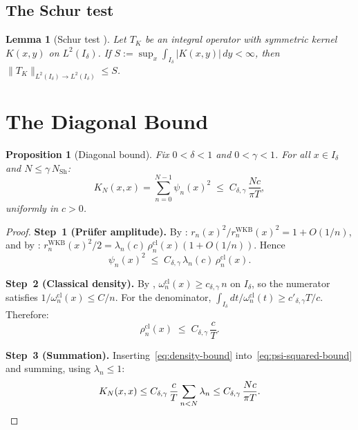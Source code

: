 \documentclass[12pt,a4paper]{article}
\newtheorem{proposition}[theorem]{Proposition}
\newtheorem{lemma}[theorem]{Lemma}
\theoremstyle{definition}
\newcommand{\NSh}{N_{\mathrm{Sh}}}
\newcommand{\wcl}{\omega_n^{\mathrm{cl}}}
\newcommand{\rhocl}{\rho_n^{\mathrm{cl}}}
\newcommand{\rWKB}{r_n^{\mathrm{WKB}}}
\begin{document}
\subsection{The Schur test}

\begin{lemma}[Schur test {\cite[Thm.~VI.23]{ReedSimonI}}]
\label{lem:schur}
Let $T_K$ be an integral operator with symmetric kernel
$K(x,y)$ on $L^2(I_\delta)$. If
$S := \sup_{x}\int_{I_\delta}|K(x,y)|\,dy < \infty$,
then
$\|T_K\|_{L^2(I_\delta)\to L^2(I_\delta)} \le S$.
\end{lemma}

\section{The Diagonal Bound}
\label{sec:diagonal}

\begin{proposition}[Diagonal bound]
\label{prop:diagonal}
Fix $0 < \delta < 1$ and $0 < \gamma < 1$.
For all $x \in I_\delta$ and $N \le \gamma\,\NSh$:
\begin{equation}
\label{eq:diagonal}
  K_N(x,x) = \sum_{n=0}^{N-1}\psi_n(x)^2
  \;\le\; C_{\delta,\gamma}\,\frac{Nc}{\pi T},
\end{equation}
uniformly in $c > 0$.
\end{proposition}

\begin{proof}
\textbf{Step~1 (Pr\"ufer amplitude).}
By \cite[Lemma~4.2]{PaperIV}:
$r_n(x)^2/\rWKB(x)^2 = 1 + O(1/n)$,
and by \cite[Lemma~4.3]{PaperIV}:
$\rWKB(x)^2/2 = \lambda_n(c)\,\rhocl(x)(1+O(1/n))$.
Hence
\begin{equation}
\label{eq:psi-squared-bound}
  \psi_n(x)^2
  \;\le\; C_{\delta,\gamma}\,\lambda_n(c)\,\rhocl(x).
\end{equation}

\textbf{Step~2 (Classical density).}
By \cite[Lemma~2.5(i)]{PaperIV},
$\wcl(x) \ge c_{\delta,\gamma}\,n$ on $I_\delta$,
so the numerator satisfies $1/\wcl(x) \le C/n$.
For the denominator,
$\int_{I_\delta} dt/\wcl(t) \ge c'_{\delta,\gamma}T/c$.
Therefore:
\begin{equation}
\label{eq:density-bound}
  \rhocl(x) \;\le\; C_{\delta,\gamma}\,\frac{c}{T}.
\end{equation}

\textbf{Step~3 (Summation).}
Inserting~\eqref{eq:density-bound}
into~\eqref{eq:psi-squared-bound} and summing,
using $\lambda_n \le 1$:
\[
  K_N(x,x)
  \le C_{\delta,\gamma}\,\frac{c}{T}
     \sum_{n<N}\lambda_n
  \le C_{\delta,\gamma}\,\frac{Nc}{\pi T}. \qedhere
\]
\end{proof}
\end{document}
